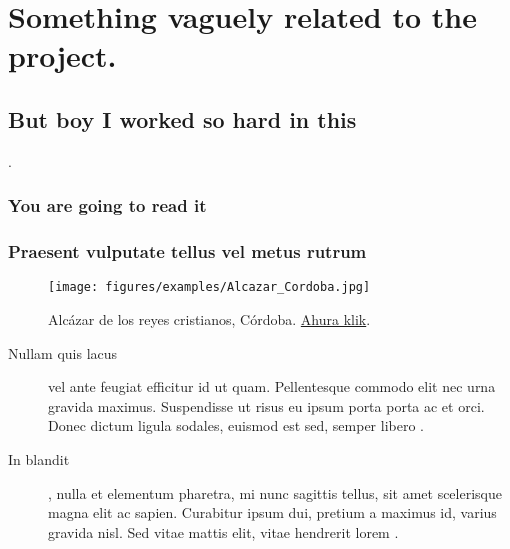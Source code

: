 % 
% 
% 




\chapter{Something vaguely related to the project.}


\section{But boy I worked so hard in this}


\lipsum[70] \cite{europa_rohs, europa_ce}.


\subsection{You are going to read it}

\lipsum[71]  \lipsum[72] 


\subsection{Praesent vulputate tellus vel metus rutrum}

\lipsum[73-75]  \cite{ds-sx1276, ds-sx1302, an1368-analog-ferrite}

\begin{figure}
    \centering
    \texttt{[image: figures/examples/Alcazar\_Cordoba.jpg]}
    \caption[Alcázar de los reyes cristianos, Córdoba.]{Alcázar de los reyes cristianos, Córdoba. \href{https://es.wikipedia.org/wiki/Archivo:Alcazar_Cordoba.jpg}{Ahura klik}.}
    \label{fig:apxA:cordoba}
\end{figure}

\lipsum[76] 

\begin{description}
    \item[Nullam quis lacus] vel ante feugiat efficitur id ut quam. Pellentesque commodo elit nec urna gravida maximus. Suspendisse ut risus eu ipsum porta porta ac et orci. Donec dictum ligula sodales, euismod est sed, semper libero . 
    \item[In blandit], nulla et elementum pharetra, mi nunc sagittis tellus, sit amet scelerisque magna elit ac sapien. Curabitur ipsum dui, pretium a maximus id, varius gravida nisl. Sed vitae mattis elit, vitae hendrerit lorem \cite{an1368-analog-ferrite, itu-r-reg-articles}.
\end{description}

